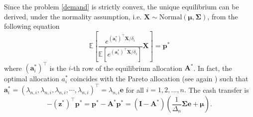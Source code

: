 \documentclass[fleqn,mnsc,nonblindrev]{informs4}
\newcommand{\tb}[1]{\textbf{#1}}
\begin{document}
  {Since the problem \eqref{demand} is strictly convex, the unique equilibrium can be derived, under the normality assumption, i.e. $\mathbf{X}\sim\text{Normal}(\boldsymbol{\mu}, \boldsymbol{\Sigma})$}, from the following equation
\begin{equation}\label{eq:equilibrium measure}
\mathbf{\mathbb{E}}\left[\frac{e^{(\mathbf{a}^*_{i}) ^\top\tb{X}/\delta_i}}{\mathbb{E}[e^{(\mathbf{a}^*_{i}) ^\top\tb{X}/\delta_i}]}\mathbf{X}\right]=\mathbf{p}^*
\end{equation}
where $(\mathbf{a}_{i}^*)^\top$ is the $i$-th row of the equilibrium allocation $\mathbf{A}^*$. In fact, the optimal allocation $a_i^*$ coincides with the Pareto allocation (see again \cite{anthropelos2010agent}) such that $\mathbf{a}_{i}^*=(\lambda_{n,i},\lambda_{n,i},\lambda_{n,i},\cdots,\lambda_{n,i})^\top=\lambda_{n,i}\tb{e}$ for all $i=1,2,...,n.$ The cash transfer is 
\[ {-(\tb{z}^*)^\top\tb{p}^* =\mathbf{p}^*-\mathbf{A}^* \tb{p}^*}=\left(\mathbf{I}-\mathbf{A}^*\right)\left(\frac{1}{\Delta_n}\mathbf{\Sigma e}+\boldsymbol{\mu}\right).
\]
\end{document}
